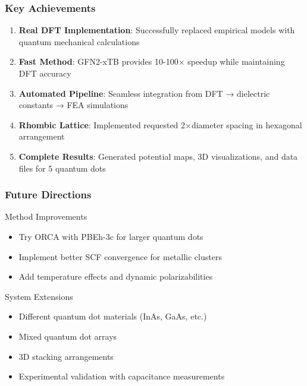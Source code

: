 \documentclass{beamer}
\begin{document}
\begin{frame}
\frametitle{Key Achievements}
\begin{enumerate}
    \item \textbf{Real DFT Implementation}: Successfully replaced empirical models with quantum mechanical calculations
    \item \textbf{Fast Method}: GFN2-xTB provides 10-100× speedup while maintaining DFT accuracy
    \item \textbf{Automated Pipeline}: Seamless integration from DFT → dielectric constants → FEA simulations
    \item \textbf{Rhombic Lattice}: Implemented requested 2×diameter spacing in hexagonal arrangement
    \item \textbf{Complete Results}: Generated potential maps, 3D visualizations, and data files for 5 quantum dots
\end{enumerate}
\end{frame}

\begin{frame}
\frametitle{Future Directions}
\begin{block}{Method Improvements}
\begin{itemize}
    \item Try ORCA with PBEh-3c for larger quantum dots
    \item Implement better SCF convergence for metallic clusters
    \item Add temperature effects and dynamic polarizabilities
\end{itemize}
\end{block}

\begin{block}{System Extensions}
\begin{itemize}
    \item Different quantum dot materials (InAs, GaAs, etc.)
    \item Mixed quantum dot arrays
    \item 3D stacking arrangements
    \item Experimental validation with capacitance measurements
\end{itemize}
\end{block}
\end{frame}
\end{document}
